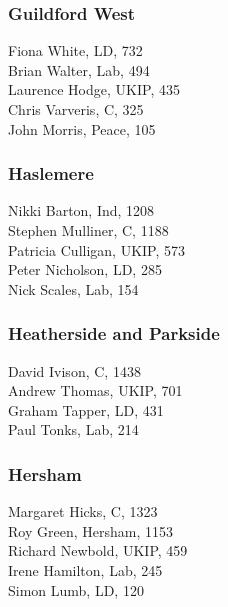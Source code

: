 \documentclass[a4paper,openany,10pt]{book}
\begin{document}
\subsubsection*{Guildford West}



Fiona White, LD, 732\\
Brian Walter, Lab, 494\\
Laurence Hodge, UKIP, 435\\
Chris Varveris, C, 325\\
John Morris, Peace, 105\\


\subsubsection*{Haslemere}



Nikki Barton, Ind, 1208\\
Stephen Mulliner, C, 1188\\
Patricia Culligan, UKIP, 573\\
Peter Nicholson, LD, 285\\
Nick Scales, Lab, 154\\


\subsubsection*{Heatherside and Parkside}



David Ivison, C, 1438\\
Andrew Thomas, UKIP, 701\\
Graham Tapper, LD, 431\\
Paul Tonks, Lab, 214\\


\subsubsection*{Hersham}



Margaret Hicks, C, 1323\\
Roy Green, Hersham, 1153\\
Richard Newbold, UKIP, 459\\
Irene Hamilton, Lab, 245\\
Simon Lumb, LD, 120\\
\end{document}
